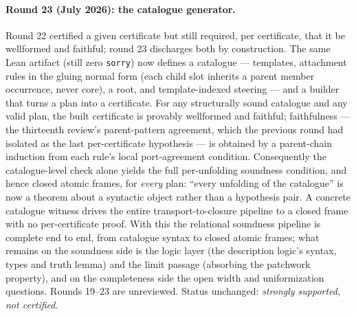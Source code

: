 \documentclass[
]{ceurart}
\theoremstyle{definition}
\begin{document}
\paragraph{Round 23 (July 2026): the catalogue generator.}
Round 22 certified a given certificate but still required, per
certificate, that it be wellformed and faithful; round 23 discharges
both by construction.  The same Lean artifact (still zero
\texttt{sorry}) now defines a catalogue --- templates, attachment
rules in the gluing normal form (each child slot inherits a parent
member occurrence, never core), a root, and template-indexed steering
--- and a builder that turns a plan into a certificate.  For any
structurally sound catalogue and any valid plan, the built
certificate is provably wellformed and faithful; faithfulness ---
the thirteenth review's parent-pattern agreement, which the previous
round had isolated as the last per-certificate hypothesis --- is
obtained by a parent-chain induction from each rule's local
port-agreement condition.  Consequently the catalogue-level check
alone yields the full per-unfolding soundness condition, and hence
closed atomic frames, for \emph{every} plan: ``every unfolding of the
catalogue'' is now a theorem about a syntactic object rather than a
hypothesis pair.  A concrete catalogue witness drives the entire
transport-to-closure pipeline to a closed frame with no
per-certificate proof.  With this the relational soundness pipeline is
complete end to end, from catalogue syntax to closed atomic frames;
what remains on the soundness side is the logic layer (the description
logic's syntax, types and truth lemma) and the limit passage
(absorbing the patchwork property), and on the completeness side the
open width and uniformization questions.  Rounds 19--23 are
unreviewed.  Status unchanged: \emph{strongly supported, not
certified}.
\end{document}
